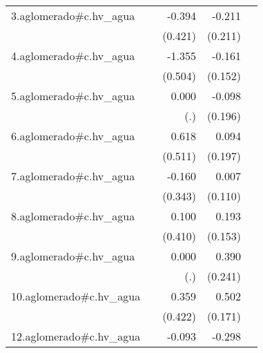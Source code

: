 {\begin{longtable}{l*{4}{D{.}{.}{-1}}}
\addlinespace
3.aglomerado#c.hv\_agua&                     &      -0.394         &      -0.211         &                     \\
            &                     &     (0.421)         &     (0.211)         &                     \\
\addlinespace
4.aglomerado#c.hv\_agua&                     &      -1.355\sym{**} &      -0.161         &                     \\
            &                     &     (0.504)         &     (0.152)         &                     \\
\addlinespace
5.aglomerado#c.hv\_agua&                     &       0.000         &      -0.098         &                     \\
            &                     &         (.)         &     (0.196)         &                     \\
\addlinespace
6.aglomerado#c.hv\_agua&                     &       0.618         &       0.094         &                     \\
            &                     &     (0.511)         &     (0.197)         &                     \\
\addlinespace
7.aglomerado#c.hv\_agua&                     &      -0.160         &       0.007         &                     \\
            &                     &     (0.343)         &     (0.110)         &                     \\
\addlinespace
8.aglomerado#c.hv\_agua&                     &       0.100         &       0.193         &                     \\
            &                     &     (0.410)         &     (0.153)         &                     \\
\addlinespace
9.aglomerado#c.hv\_agua&                     &       0.000         &       0.390         &                     \\
            &                     &         (.)         &     (0.241)         &                     \\
\addlinespace
10.aglomerado#c.hv\_agua&                     &       0.359         &       0.502\sym{**} &                     \\
            &                     &     (0.422)         &     (0.171)         &                     \\
\addlinespace
12.aglomerado#c.hv\_agua&                     &      -0.093         &      -0.298         &                     \\

\end{longtable}}
